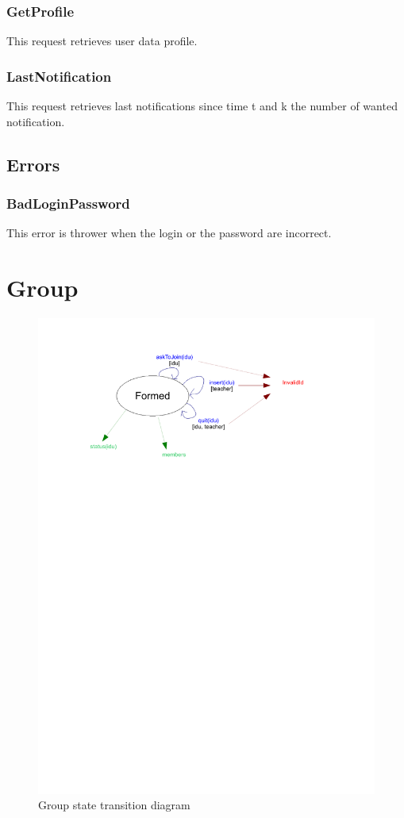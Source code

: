 		\subsubsection{GetProfile}
			This request retrieves user data profile.
		\subsubsection{LastNotification}
			This request retrieves last notifications since time t and k the number of wanted notification.
	\subsection{Errors}
		\subsubsection{BadLoginPassword}
			This error is thrower when the login or the password are incorrect.
\newpage
\section{Group}
	\begin{figure}[ht]
			\begin{center}
				\includegraphics[width=\textwidth,  trim=2cm 18cm 2cm 1cm]{UML_figure/state_transition/dojo_logic/st_group.pdf}
				\caption{Group state transition diagram}
			\end{center}
	\end{figure}
